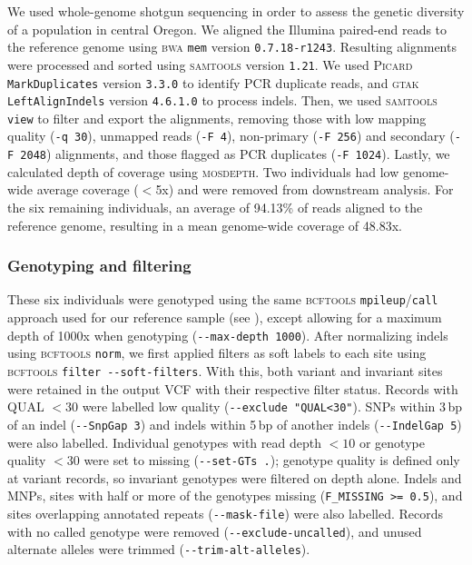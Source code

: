 We used whole-genome shotgun sequencing in order to assess the genetic diversity of
a \bgla{} population in central Oregon.
We aligned the Illumina paired-end reads to the reference genome using \textsc{bwa}
\texttt{mem} version \texttt{0.7.18-r1243}.
Resulting alignments were processed and sorted using \textsc{samtools} version
\texttt{1.21}.
We used \textsc{Picard} \texttt{MarkDuplicates} version \texttt{3.3.0}
\citep{picard} to identify PCR duplicate reads, and
\textsc{gtak} \texttt{LeftAlignIndels} version \texttt{4.6.1.0}
\citep{mckenna_gatk_2010,depristo_framework_2011} to process indels.
Then, we used \textsc{samtools} \texttt{view} to filter and export the alignments,
removing those with low mapping quality (\texttt{-q 30}), unmapped reads (\texttt{-F 4}),
non-primary (\texttt{-F 256}) and secondary (\texttt{-F 2048}) alignments, and those
flagged as PCR duplicates (\texttt{-F 1024}).
Lastly, we calculated depth of coverage using \textsc{mosdepth}.
Two individuals had low genome-wide average coverage ($<$5x) and were removed from
downstream analysis.
For the six remaining individuals, an average of 94.13\% of reads aligned to the 
reference genome, resulting in a mean genome-wide coverage of 48.83x.

\subsubsection*{Genotyping and filtering}\label{sec:methods_genotypes}

These six individuals were genotyped using the same \textsc{bcftools}
\texttt{mpileup}/\texttt{call} approach used for our reference sample
(see ), except allowing for a maximum depth of 1000x when
genotyping (\texttt{-{}-max-depth 1000}).
After normalizing indels using \textsc{bcftools} \texttt{norm}, we first applied filters
as soft labels to each site using \textsc{bcftools} \texttt{filter -{}-soft-filters}.
With this, both variant and invariant sites were retained in the output VCF with their
respective filter status.
Records with QUAL $<30$ were labelled low quality (\texttt{-{}-exclude "QUAL<30"}).
SNPs within 3\,bp of an indel (\texttt{-{}-SnpGap 3}) and indels within 5\,bp of another
indels (\texttt{-{}-IndelGap 5}) were also labelled.
Individual genotypes with read depth $<10$ or genotype quality $<30$ were set to missing
(\texttt{-{}-set-GTs~.});
genotype quality is defined only at variant records, so invariant genotypes were filtered
on depth alone.
Indels and MNPs, sites with half or more of the genotypes missing (\texttt{F\_MISSING >= 0.5}),
and sites overlapping annotated repeats (\texttt{-{}-mask-file}) were also labelled.
Records with no called genotype were removed (\texttt{-{}-exclude-uncalled}), and unused
alternate alleles were trimmed (\texttt{-{}-trim-alt-alleles}).
\vspace{0.1cm}

